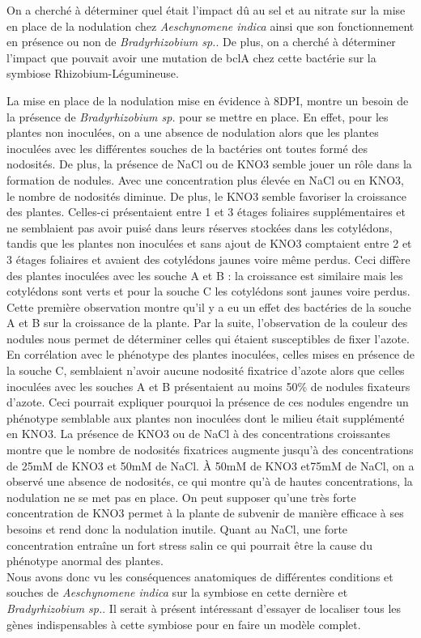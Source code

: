 \documentclass[12pt,a4paper,onecolumn]{article}
\begin{document}
\begin{multicols}{2}
			On a cherché à déterminer quel était l’impact dû au sel et au nitrate sur la mise en place de la nodulation chez \textit{Aeschynomene indica} ainsi que son fonctionnement en présence ou non de \textit{Bradyrhizobium sp.}. De plus, on a cherché à déterminer l’impact que pouvait avoir une mutation de bclA chez cette bactérie sur la symbiose Rhizobium-Légumineuse.

			La mise en place de la nodulation mise en évidence à 8DPI, montre un besoin de la présence de \textit{Bradyrhizobium sp.} pour se mettre en place. En effet, pour les plantes non inoculées, on a une absence de nodulation alors que les plantes inoculées avec les différentes souches de la bactéries ont toutes formé des nodosités. De plus, la présence de NaCl ou de KNO3 semble jouer un rôle dans la formation de nodules. Avec une concentration plus élevée en NaCl ou en KNO3, le nombre de nodosités diminue. De plus, le KNO3 semble favoriser la croissance des plantes. Celles-ci présentaient entre 1 et 3 étages foliaires supplémentaires et ne semblaient pas avoir puisé dans leurs réserves stockées dans les cotylédons, tandis que les plantes non inoculées et sans ajout de KNO3 comptaient entre 2 et 3 étages foliaires et avaient des cotylédons jaunes voire même perdus. Ceci diffère des plantes inoculées avec les souche A et B : la croissance est similaire mais les cotylédons sont verts et pour la souche C les cotylédons sont jaunes voire perdus. Cette première observation montre qu’il y a eu un effet des bactéries de la souche A et B sur la croissance de la plante. Par la suite, l’observation de la couleur des nodules nous permet de déterminer celles qui étaient susceptibles de fixer l’azote. En corrélation avec le phénotype des plantes inoculées, celles mises en présence de la souche C, semblaient n'avoir aucune nodosité fixatrice d’azote alors que celles inoculées avec les souches A et B présentaient au moins 50\% de nodules fixateurs d’azote. Ceci pourrait expliquer pourquoi la présence de ces nodules engendre un phénotype semblable aux plantes non inoculées dont le milieu était supplémenté en KNO3. La présence de KNO3 ou de NaCl à des concentrations croissantes montre que le nombre de nodosités fixatrices augmente jusqu’à des concentrations de 25mM de KNO3 et 50mM de NaCl. À 50mM de KNO3 et75mM de NaCl, on a observé une absence de nodosités, ce qui montre qu’à de hautes concentrations, la nodulation ne se met pas en place. On peut supposer qu’une très forte concentration de KNO3 permet à la plante de subvenir de manière efficace à ses besoins et rend donc la nodulation inutile. Quant au NaCl, une forte concentration entraîne un fort stress salin ce qui pourrait être la cause du phénotype anormal des plantes.\\
			Nous avons donc vu les conséquences anatomiques de différentes conditions et souches de \textit{Aeschynomene indica} sur la symbiose en cette dernière et \textit{Bradyrhizobium sp.}. Il serait à présent intéressant d'essayer de localiser tous les gènes indispensables à cette symbiose pour en faire un modèle complet.

		\end{multicols}
\end{document}
